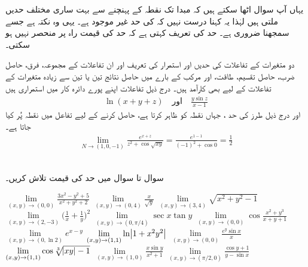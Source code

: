 یہاں آپ سوال اٹھا سکتے ہیں کہ مبدا تک نقطہ  کے پہنچنے سے بہت ساری  مختلف حدیں  ملتی ہیں لہٰذا یہ کہنا درست نہیں کہ  کی حد غیر موجود ہے۔ یہی وہ  نکتہ ہے جسے سمجھنا ضروری ہے۔ حد کی تعریف  کہتی ہے کہ حد کی قیمت راہ پر منحصر نہیں ہو سکتی۔

دو متغیرات کے تفاعلات   کی حدیں اور استمرار کی تعریف  اور ان  تفاعلات کے مجموعہ،  فرق، حاصل ضرب، حاصل تقسیم، طاقت،  اور مرکب کے بارے میں حاصل نتائج  تین یا تین سے زیادہ متغیرات کے تفاعلات کے لیے بھی کارآمد  ہیں۔ درج ذیل تفاعلات  اپنے پورے دائرہ کار میں استمراری ہیں
\begin{align*}
\ln(x+y+z)\quad \text{اور}\quad \frac{y\sin z}{x-1}
\end{align*} 
اور  درج ذیل طرز کی حد ، جہاں  نقطہ  کو ظاہر کرتا ہے،   حاصل کرنے کے لیے  تفاعل میں نقطہ پُر  کیا جاتا ہے۔
\begin{align*}
\lim_{N\to(1,0,-1)}\frac{e^{x+z}}{z^2+\cos\sqrt{xy}}=\frac{e^{1-1}}{(-1)^2+\cos 0}=\frac{1}{2}
\end{align*}

\\
سوال  تا سوال  میں حد کی قیمت تلاش کریں۔

$\lim\limits_{(x,y)\to(0,0)}\frac{3x^2-y^2+5}{x^2+y^2+2}$
$\lim\limits_{(x,y)\to(0,4)}\frac{x}{\sqrt{y}}$
$\lim\limits_{(x,y)\to(3,4)}\sqrt{x^2+y^2-1}$
$\lim\limits_{(x,y)\to(2,-3)}\big(\frac{1}{x}+\frac{1}{y}\big)^2$
$\lim\limits_{(x,y)\to(0,\pi/4)}\sec x\tan y$
$\lim\limits_{(x,y)\to(0,0)}\cos\frac{x^2+y^3}{x+y+1}$
$\lim\limits_{(x,y)\to(0,\ln 2)}e^{x-y}$
$\lim\limits_{(x,y)\to(1,1)}\ln\abs{1+x^2y^2}$
$\lim\limits_{(x,y)\to(0,0)} \frac{e^y\sin x}{x}$
$\lim\limits_{(x,y)\to(1,1)}\cos\sqrt[3]{\abs{xy}-1}$
$\lim\limits_{(x,y)\to(1,0)}\frac{x\sin y}{x^2+1}$
$\lim\limits_{(x,y)\to(\pi/2,0)}\frac{\cos y+1}{y-\sin x}$

